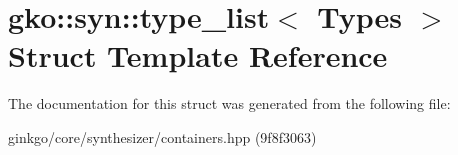 \hypertarget{structgko_1_1syn_1_1type__list}{}\section{gko\+:\+:syn\+:\+:type\+\_\+list$<$ Types $>$ Struct Template Reference}
\label{structgko_1_1syn_1_1type__list}


The documentation for this struct was generated from the following file\+:\begin{DoxyCompactItemize}
\item 
ginkgo/core/synthesizer/containers.\+hpp (9f8f3063)\end{DoxyCompactItemize}
